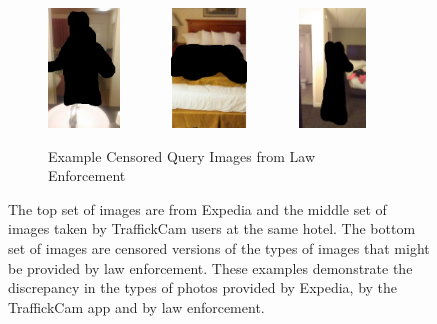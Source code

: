 \begin{figure}[ht!]
\begin{center}
  \begin{subfigure}[b]{\textwidth}
  \centering
    \includegraphics[height=120px]{figures/chapter3/backpage/3.jpg}
    ~~~~~~
    \includegraphics[height=120px]{figures/chapter3/backpage/1.jpg}
    ~~~~~~
    \includegraphics[height=120px]{figures/chapter3/backpage/2.jpg}
    \caption{Example Censored Query Images from Law Enforcement}
  \end{subfigure}
  
  \caption[Example images from TraffickCam and Expedia.]{The top set of images are from Expedia and the middle set of images taken by TraffickCam users at the same hotel. The bottom set of images are censored versions of the types of images that might be provided by law enforcement. These examples demonstrate the discrepancy in the types of photos provided by Expedia, by the TraffickCam app and by law enforcement.}
  \label{fig:example_ims}
  \end{center}
\end{figure}

